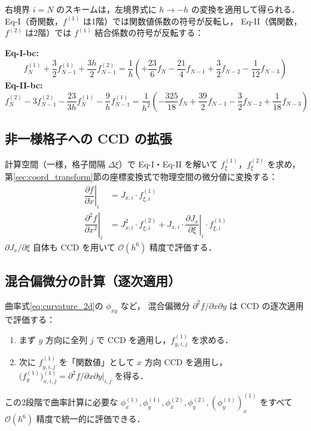 \documentclass[12pt, a4paper, titlepage]{article}
\newcommand{\jp}[1]{{\normalfont\jpfont #1}}
\newcommand{\pd}[2]{\dfrac{\partial #1}{\partial #2}}
\newcommand{\pdd}[2]{\dfrac{\partial^2 #1}{\partial #2^2}}
\newcommand{\Ord}[1]{\mathcal{O}(#1)}
\newcommand{\fp}[1]{f^{(1)}_{#1}}
\newcommand{\fpp}[1]{f^{(2)}_{#1}}
\begin{document}
\jp{右境界 $i=N$ のスキームは，左境界式に $h\to-h$ の変換を適用して得られる．
Eq-I（奇関数，$\fp{}$ は1階）では関数値係数の符号が反転し，
Eq-II（偶関数，$\fpp{}$ は2階）では $\fp{}$ 結合係数の符号が反転する：}

\begin{tcolorbox}[mybox, title={\jp{右境界スキーム（$i=N$，$\Ord{h^5}$）}}]
\textbf{Eq-I-bc:}
\begin{equation}
  \fp{N} + \frac{3}{2}\fp{N-1} + \frac{3h}{2}\fpp{N-1}
  = \frac{1}{h}\!\left(
    +\frac{23}{6}f_N
    - \frac{21}{4}f_{N-1}
    + \frac{3}{2}f_{N-2}
    - \frac{1}{12}f_{N-3}
  \right)
  \label{eq:bc_I_right}
\end{equation}
\textbf{Eq-II-bc:}
\begin{equation}
  \fpp{N} - 3\fpp{N-1}
  - \frac{23}{3h}\fp{N}
  - \frac{9}{h}\fp{N-1}
  = \frac{1}{h^2}\!\left(
    -\frac{325}{18}f_N
    + \frac{39}{2}f_{N-1}
    - \frac{3}{2}f_{N-2}
    + \frac{1}{18}f_{N-3}
  \right)
  \label{eq:bc_II_right}
\end{equation}
\end{tcolorbox}

\subsection{\jp{非一様格子への CCD の拡張}}

\jp{計算空間（一様，格子間隔 $\Delta\xi$）で Eq-I・Eq-II を解いて
$f^{(1)}_{\xi}$，$f^{(2)}_{\xi}$ を求め，
第\ref{sec:coord_transform}節の座標変換式で物理空間の微分値に変換する：}
\begin{align}
  \left.\pd{f}{x}\right|_i
    &= J_{x,i}\cdot f^{(1)}_{\xi,i}
  \label{eq:nonuniform_1st}\\[6pt]
  \left.\pdd{f}{x}\right|_i
    &= J_{x,i}^2\cdot f^{(2)}_{\xi,i}
     + J_{x,i}\cdot\left.\pd{J_x}{\xi}\right|_i \cdot f^{(1)}_{\xi,i}
  \label{eq:nonuniform_2nd}
\end{align}
\jp{$\partial J_x/\partial\xi$ 自体も CCD を用いて $\Ord{h^6}$ 精度で評価する．}

\subsection{\jp{混合偏微分の計算（逐次適用）}}

\jp{曲率式\eqref{eq:curvature_2d}の $\phi_{xy}$ など，
混合偏微分 $\partial^2 f/\partial x\partial y$ は CCD の逐次適用で評価する：}
\begin{enumerate}
  \item \jp{まず $y$ 方向に全列 $j$ で CCD を適用し，$f^{(1)}_{y,i,j}$ を求める．}
  \item \jp{次に $f^{(1)}_{y,i,j}$ を「関数値」として $x$ 方向 CCD を適用し，
        $\bigl(f^{(1)}_y\bigr)^{(1)}_{x,i,j} = \partial^2 f/\partial x\partial y|_{i,j}$ を得る．}
\end{enumerate}
\jp{この2段階で曲率計算に必要な
$\phi^{(1)}_x, \phi^{(1)}_y, \phi^{(2)}_x, \phi^{(2)}_y, (\phi^{(1)}_y)^{(1)}_x$
をすべて $\Ord{h^6}$ 精度で統一的に評価できる．}
\end{document}
